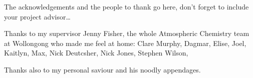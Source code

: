 \begin{acknowledgements}
  \addchaptertocentry{\acknowledgementname} %

  The acknowledgements and the people to thank go here, don't forget to include your project advisor\ldots

  Thanks to my supervisor Jenny Fisher, the whole Atmospheric Chemistry team at Wollongong who made me feel at home: Clare Murphy, Dagmar, Elise, Joel, Kaitlyn, Max, Nick Deutcsher, Nick Jones, Stephen Wilson, 

  Thanks also to my personal saviour and his noodly appendages.

\end{acknowledgements}